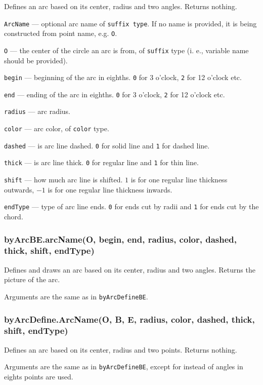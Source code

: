 \documentclass{ltxdoc}
\begin{document}
Defines an arc based on its center, radius and two angles. Returns nothing.

\texttt{ArcName} — optional arc name of \texttt{suffix type}. If no name is provided, it is being constructed from point name, e.g. \texttt{O}.

\texttt{O} — the center of the circle an arc is from, of \texttt{suffix} type (i. e., variable name should be provided).

\texttt{begin} — beginning of the arc in eighths. \texttt{0} for 3 o'clock, \texttt{2} for 12 o'clock etc.

\texttt{end} — ending of the arc in eighths. \texttt{0} for 3 o'clock, \texttt{2} for 12 o'clock etc.

\texttt{radius} — arc radius.

\texttt{color} — arc color, of \texttt{color} type.

\texttt{dashed} — is arc line dashed. \texttt{0} for solid line and \texttt{1} for dashed line.

\texttt{thick} — is arc line thick. \texttt{0} for regular line and \texttt{1} for thin line.

\texttt{shift} — how much arc line is shifted. \texttt{$1$} is for one regular line thickness outwards, \texttt{$-1$} is for one regular line thickness inwards.

\texttt{endType} — type of arc line ends. \texttt{0} for ends cut by radii and \texttt{1} for ends cut by the chord.

\subsubsection{byArcBE.arcName(O, begin, end, radius, color, dashed, thick, shift, endType)}

Defines and draws an arc based on its center, radius and two angles. Returns the picture of the arc.

Arguments are the same as in \texttt{byArcDefineBE}.

\subsubsection{byArcDefine.ArcName(O, B, E, radius, color, dashed, thick, shift, endType)}

Defines an arc based on its center, radius and two points. Returns nothing.

Arguments are the same as in \texttt{byArcDefineBE}, except for instead of angles in eights points are used.
\end{document}
